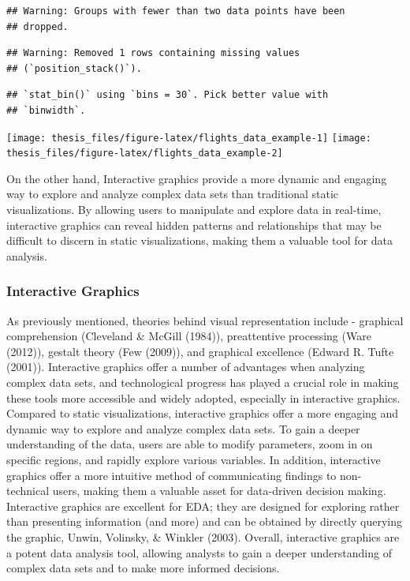 \documentclass[print]{nuthesis}
\begin{document}
\begin{verbatim}
## Warning: Groups with fewer than two data points have been
## dropped.
\end{verbatim}

\begin{verbatim}
## Warning: Removed 1 rows containing missing values
## (`position_stack()`).
\end{verbatim}

\begin{verbatim}
## `stat_bin()` using `bins = 30`. Pick better value with
## `binwidth`.
\end{verbatim}

\begin{center}\texttt{[image: thesis\_files/figure-latex/flights\_data\_example-1]} \texttt{[image: thesis\_files/figure-latex/flights\_data\_example-2]} \end{center}

On the other hand, Interactive graphics provide a more dynamic and engaging way to explore and analyze complex data sets than traditional static visualizations.
By allowing users to manipulate and explore data in real-time, interactive graphics can reveal hidden patterns and relationships that may be difficult to discern in static visualizations, making them a valuable tool for data analysis.

\hypertarget{interactive-graphics}{%
\subsubsection{Interactive Graphics}\label{interactive-graphics}}

As previously mentioned, theories behind visual representation include - graphical comprehension (Cleveland \& McGill (1984)), preattentive processing (Ware (2012)), gestalt theory (Few (2009)), and graphical excellence (Edward R. Tufte (2001)).
Interactive graphics offer a number of advantages when analyzing complex data sets, and technological progress has played a crucial role in making these tools more accessible and widely adopted, especially in interactive graphics.
Compared to static visualizations, interactive graphics offer a more engaging and dynamic way to explore and analyze complex data sets.
To gain a deeper understanding of the data, users are able to modify parameters, zoom in on specific regions, and rapidly explore various variables.
In addition, interactive graphics offer a more intuitive method of communicating findings to non-technical users, making them a valuable asset for data-driven decision making.
Interactive graphics are excellent for EDA; they are designed for exploring rather than presenting information (and more) and can be obtained by directly querying the graphic, Unwin, Volinsky, \& Winkler (2003).
Overall, interactive graphics are a potent data analysis tool, allowing analysts to gain a deeper understanding of complex data sets and to make more informed decisions.
\end{document}
